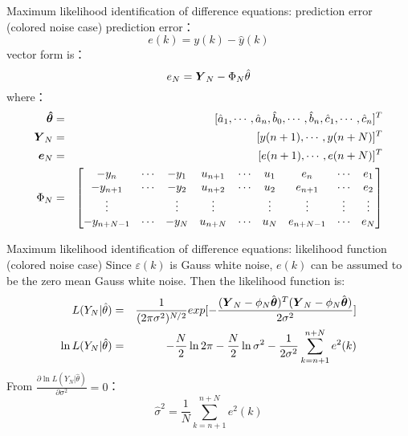 \bgroup
{}
\begin{frame}{ Maximum likelihood identification of difference equations: prediction error (colored noise case) }
prediction error：
$$
e(k)=y(k)-\hat y(k)
$$
vector form is：
$$
e_N=\boldsymbol{Y}_N-\Phi_N\hat\theta
$$
where：
\begin{eqnarray*}
\boldsymbol{\hat\theta} &=& [\hat a_1, \cdots, \hat a_n, \hat b_0 , \cdots, \hat b_n, \hat c_1, \cdots, \hat c_n]^T \\
\boldsymbol{Y}_N &=& [y(n+1), \cdots, y(n+N)]^T \\
\boldsymbol{e}_N &=& [e(n+1), \cdots, e(n+N)]^T \\
\Phi_N &=& 
\begin{bmatrix}
-y_n & \cdots & -y_1 & u_{n+1} & \cdots & u_1  & e_n & \cdots & e_1 \\
-y_{n+1} & \cdots & -y_2 & u_{n+2} & \cdots & u_2  & e_{n+1} & \cdots & e_2 \\
\vdots &        & \vdots &   \vdots &      &\vdots & \vdots & \vdots & \vdots \\
-y_{n+N-1} & \cdots & -y_N & u_{n+N} & \cdots & u_N  & e_{n+N-1} & \cdots & e_N
\end{bmatrix}
\end{eqnarray*}
\end{frame}
\egroup

\begin{frame}{ Maximum likelihood identification of difference equations: likelihood function (colored noise case) }
Since $\varepsilon(k)$ is Gauss white noise, $e (k) $ can be assumed to be the zero mean Gauss white noise. Then the likelihood function is: 
\begin{eqnarray*}
L(Y_N|\hat{\theta}) &=& \frac{1}{(2\pi\sigma^2)^{N/2}}exp[-\frac{(\boldsymbol{Y}_N-\phi_N\hat{\boldsymbol{\theta}})^T(\boldsymbol{Y}_N-\phi_N\hat{\boldsymbol{\theta}})}{2\sigma^2}] \\
\ln L(Y_N|\hat{\theta}) &=& - \frac{N}{2}\ln{2\pi}-\frac{N}{2}\ln\sigma^2-\frac{1}{2\sigma^2}\sum^{n+N}_{k=n+1}e^2(k)
\end{eqnarray*}
From $\frac{\partial\ln L(Y_N|\hat{\theta})}{\partial\sigma^2}=0$：
$$
\hat\sigma^2=\frac{1}{N}\sum^{n+N}_{k=n+1}e^2(k)
$$
\end{frame}

